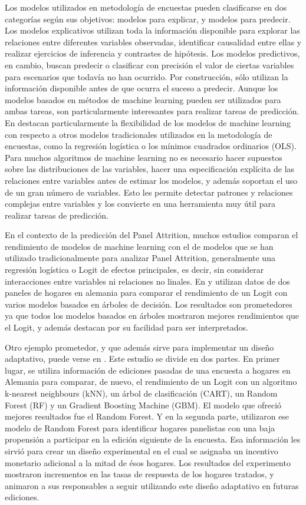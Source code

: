 Los modelos utilizados en metodología de encuestas pueden clasificarse en dos categorías según sus objetivos: modelos para explicar, y modelos para predecir. Los modelos explicativos utilizan toda la información disponible para explorar las relaciones entre diferentes variables observadas, identificar causalidad entre ellas y realizar ejercicios de inferencia y contrastes de hipótesis. Los modelos predictivos, en cambio, buscan predecir o clasificar con precisión el valor de ciertas variables para escenarios que todavía no han ocurrido. Por construcción, sólo utilizan la información disponible antes de que ocurra el suceso a predecir. Aunque los modelos basados en métodos de machine learning pueden ser utilizados para ambas tareas, son particularmente interesantes para realizar tareas de predicción. En \cite{buskirk2018introduction} destacan particularmente la flexibilidad de los modelos de machine learning con respecto a otros modelos tradicionales utilizados en la metodología de encuestas, como la regresión logística o los mínimos cuadrados ordinarios (OLS). Para muchos algoritmos de machine learning no es necesario hacer supuestos sobre las distribuciones de las variables, hacer una especificación explícita de las relaciones entre variables antes de estimar los modelos, y además soportan el uso de un gran número de variables. Esto les permite detectar patrones y relaciones complejas entre variables y los convierte en una herramienta muy útil para realizar tareas de predicción.

En el contexto de la predicción del Panel Attrition, muchos estudios comparan el rendimiento de modelos de machine learning con el de modelos que se han utilizado tradicionalmente para analizar Panel Attrition, generalmente una regresión logística o Logit de efectos principales, es decir, sin considerar interacciones entre variables ni relaciones no linales. En \cite{kern2019tree} y \cite{kern2021predicting} utilizan datos de dos paneles de hogares en alemania para comparar el rendimiento de un Logit con varios modelos basados en árboles de decisión. Los resultados son prometedores ya que todos los modelos basados en árboles mostraron mejores rendimientos que el Logit, y además destacan por su facilidad para ser interpretados.

Otro ejemplo prometedor, y que además sirve para implementar un diseño adaptativo, puede verse en \cite{beste2023case}. Este estudio se divide en dos partes. En primer lugar, se utiliza información de ediciones pasadas de una encuesta a hogares en Alemania para comparar, de nuevo, el rendimiento de un Logit con un algoritmo k-nearest neighbours (kNN), un árbol de clasificación (CART), un Random Forest (RF) y un Gradient Boosting Machine (GBM). El modelo que ofreció mejores resultados fue el Random Forest. Y en la segunda parte, utilizaron ese modelo de Random Forest para identificar hogares panelistas con una baja propensión a participar en la edición siguiente de la encuesta. Esa información les sirvió para crear un diseño experimental en el cual se asignaba un incentivo monetario adicional a la mitad de ésos hogares. Los resultados del experimento mostraron incrementos en las tasas de respuesta de los hogares tratados, y animaron a sus responsables a seguir utilizando este diseño adaptativo en futuras ediciones.

